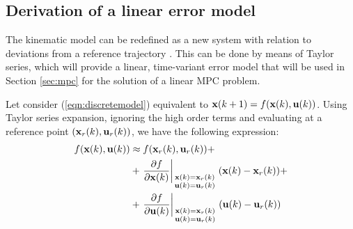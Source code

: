 \documentclass[twocolumn]{IEEEtran} %
\begin{document}
\subsection{Derivation of a linear error model}
The kinematic model can be redefined as a new system with relation to deviations from a reference trajectory . This can be done by means of Taylor series, which will provide a linear, time-variant error model that will be used in Section \ref{sec:mpc} for the solution of a linear MPC problem. 

Let consider (\ref{eqn:discretemodel}) equivalent to ${\bf x}(k+1)=f({\bf x}(k),{\bf u}(k))$. Using Taylor series expansion, ignoring the high order terms and evaluating at a reference point $({\bf x}_r(k),{\bf u}_r(k))$, we have the following expression:
\begin{align*}
	f({\bf x}(k),{\bf u}(k)) &\approx f({\bf x}_r(k),{\bf u}_r(k)) + \\ &+ \left.\frac{\partial f}{\partial{\bf x}(k)}\right|_{\begin{smallmatrix}{\bf x}(k)={\bf x}_r(k) \\ {\bf u}(k)={\bf u}_r(k) \end{smallmatrix}}({\bf x}(k)-{\bf x}_r(k)) + \\ &+ \left.\frac{\partial f}{\partial{\bf u}(k)}\right|_{\begin{smallmatrix}{\bf x}(k)={\bf x}_r(k) \\ {\bf u}(k)={\bf u}_r(k) \end{smallmatrix}}({\bf u}(k)-{\bf u}_r(k))
\end{align*}
\end{document}
